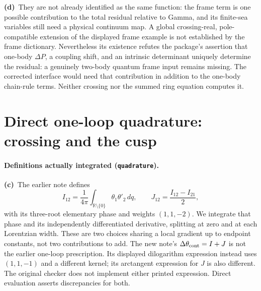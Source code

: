 \documentclass[11pt,a4paper]{article}
\newcommand{\Lc}{\textbf{(c)}\ }
\newcommand{\Ld}{\textbf{(d)}\ }
\begin{document}
\Ld They are not already identified as the same function: the frame term is
one possible contribution to the total residual relative to Gamma, and its
finite-sea variables still need a physical continuum map. A global
crossing-real, pole-compatible extension of the displayed frame example
is not established by the frame dictionary. Nevertheless its existence
refutes the package's assertion that one-body $\Delta P$, a coupling shift,
and an intrinsic determinant uniquely determine the residual: a genuinely
two-body quantum frame input remains missing. The corrected interface would
need that contribution in addition to the one-body chain-rule terms. Neither
crossing nor the summed ring equation computes it.

\section{Direct one-loop quadrature: crossing and the cusp}
\paragraph{Definitions actually integrated (\texttt{quadrature}).}
\Lc The earlier note defines
\begin{equation}
 I_{12}=\frac1{4\pi}\int_{\mathbb R\setminus\{0\}}\theta_1\theta'_2\,dq,
 \qquad J_{12}=\frac{I_{12}-I_{21}}2,
\end{equation}
with its three-root elementary phase and weights $(1,1,-2)$.
We integrate that phase and its independently differentiated derivative,
splitting at zero and at each Lorentzian width. These are two choices
sharing a local gradient up to endpoint constants, not two contributions
to add. The new note's $\Delta\theta_{\rm cont}=I+J$ is not the earlier
one-loop prescription. Its displayed dilogarithm expression instead uses
$(1,1,-1)$ and a different kernel; its arctangent expression for $J$ is
also different. The original checker does not implement either printed
expression. Direct evaluation asserts discrepancies for both.
\end{document}
